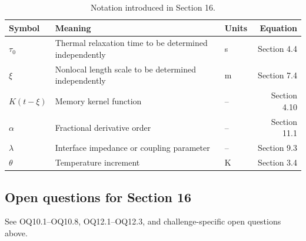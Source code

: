 \begin{table}[h]
\centering
\small
\caption{Notation introduced in Section 16.}
\label{tab:notation-sec16}
\begin{tabularx}{\textwidth}{@{}lXlr@{}}
\toprule
\textbf{Symbol} & \textbf{Meaning} & \textbf{Units} & \textbf{Equation} \\
\midrule
$\tau_0$ & Thermal relaxation time to be determined independently & s & Section 4.4 \\
$\xi$ & Nonlocal length scale to be determined independently & m & Section 7.4 \\
$K(t-\xi)$ & Memory kernel function & -- & Section 4.10 \\
$\alpha$ & Fractional derivative order & -- & Section 11.1 \\
$\lambda$ & Interface impedance or coupling parameter & -- & Section 9.3 \\
$\theta$ & Temperature increment & K & Section 3.4 \\
\bottomrule
\end{tabularx}
\end{table}

\subsection{Open questions for Section 16}

See OQ10.1--OQ10.8, OQ12.1--OQ12.3, and challenge-specific open questions above.

